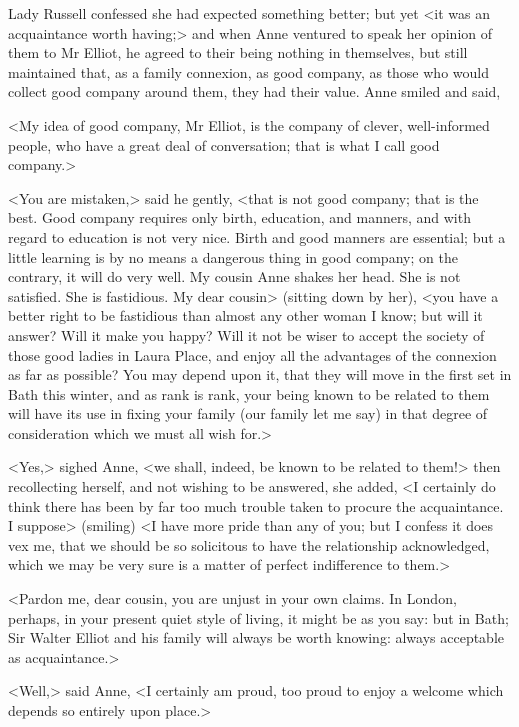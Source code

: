 Lady Russell confessed she had expected something better; but yet <it was an acquaintance worth having;> and when Anne ventured to speak her opinion of them to Mr Elliot, he agreed to their being nothing in themselves, but still maintained that, as a family connexion, as good company, as those who would collect good company around them, they had their value. Anne smiled and said,

<My idea of good company, Mr Elliot, is the company of clever, well-informed people, who have a great deal of conversation; that is what I call good company.>

<You are mistaken,> said he gently, <that is not good company; that is the best. Good company requires only birth, education, and manners, and with regard to education is not very nice. Birth and good manners are essential; but a little learning is by no means a dangerous thing in good company; on the contrary, it will do very well. My cousin Anne shakes her head. She is not satisfied. She is fastidious. My dear cousin> (sitting down by her), <you have a better right to be fastidious than almost any other woman I know; but will it answer? Will it make you happy? Will it not be wiser to accept the society of those good ladies in Laura Place, and enjoy all the advantages of the connexion as far as possible? You may depend upon it, that they will move in the first set in Bath this winter, and as rank is rank, your being known to be related to them will have its use in fixing your family (our family let me say) in that degree of consideration which we must all wish for.>

<Yes,> sighed Anne, <we shall, indeed, be known to be related to them!> then recollecting herself, and not wishing to be answered, she added, <I certainly do think there has been by far too much trouble taken to procure the acquaintance. I suppose> (smiling) <I have more pride than any of you; but I confess it does vex me, that we should be so solicitous to have the relationship acknowledged, which we may be very sure is a matter of perfect indifference to them.>

<Pardon me, dear cousin, you are unjust in your own claims. In London, perhaps, in your present quiet style of living, it might be as you say: but in Bath; Sir Walter Elliot and his family will always be worth knowing: always acceptable as acquaintance.>

<Well,> said Anne, <I certainly am proud, too proud to enjoy a welcome which depends so entirely upon place.>

